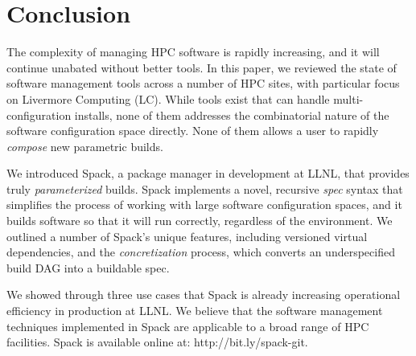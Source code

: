 
\section{Conclusion}
\label{sec:conclusion}


The complexity of managing HPC software is rapidly increasing, and it
will continue unabated without better tools.
In this paper, we reviewed the state of software management tools
across a number of HPC sites, with particular focus on Livermore
Computing (LC). While tools exist that can handle multi-configuration
installs, none of them addresses the combinatorial nature
of the software configuration space directly. None of them allows
a user to rapidly {\it compose} new parametric builds.

We introduced Spack, a package manager in development at LLNL, that
provides truly {\it parameterized} builds.  Spack implements
a novel, recursive {\it spec} syntax that simplifies the process of working
with large software configuration spaces, and it builds software
so that it will run correctly, regardless of the environment.
We outlined a number of Spack's unique features, including
versioned virtual dependencies, and the {\it concretization} process,
which converts an underspecified build DAG into a buildable spec.

We showed through three use cases that Spack is already
increasing operational efficiency
in production at LLNL.  We believe that the software management
techniques implemented in
Spack are applicable to a broad range of HPC facilities.
Spack is available online at: http://bit.ly/spack-git.
